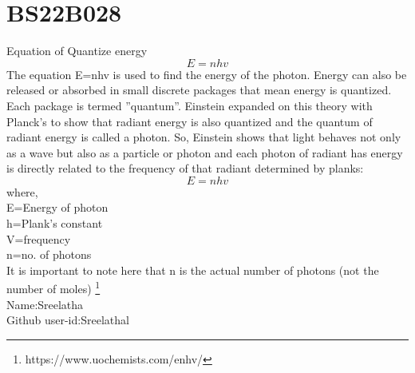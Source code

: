 \documentclass{article}
\begin{document}
\section*{BS22B028}
Equation of Quantize energy
$$ E = nhv $$
The equation E=nhv is used to find the energy of the photon. Energy can also be released or absorbed in small discrete packages that mean energy is quantized. Each
package is termed ”quantum”. Einstein expanded on this theory with Planck’s to show that radiant energy is also quantized and the quantum of radiant energy is called
a photon. So, Einstein shows that light behaves not only as a wave but also as a particle or photon and each photon of radiant has energy is directly related to the
frequency of that radiant determined by planks:
$$ E=nhv $$
where,\\
E=Energy of photon\\
h=Plank’s constant\\
V=frequency\\
n=no. of photons\\
It is important to note here that n is the actual number of photons (not the number of moles) \footnote{https://www.uochemists.com/enhv/}\\
Name:Sreelatha\\
Github user-id:Sreelathal
\end{document}
